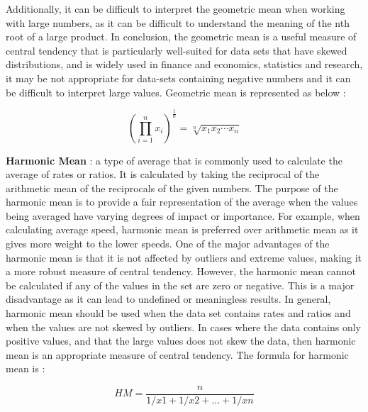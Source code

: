Additionally, it can be difficult to interpret the geometric mean when working with large numbers, as it can be difficult to understand the meaning of the nth root of a large product. In conclusion, the geometric mean is a useful measure of central tendency that is particularly well-suited for data sets that have skewed distributions, and is widely used in finance and economics, statistics and research, it may be not appropriate for data-sets containing negative numbers and it can be difficult to interpret large values. Geometric mean is represented as below :

\begin{equation}
    \left(\prod _{i=1}^{n}x_{i}\right)^{\frac {1}{n}}={\sqrt[{n}]{x_{1}x_{2}\cdots x_{n}}}
\end{equation}


\textbf{Harmonic Mean} :  a type of average that is commonly used to calculate the average of rates or ratios. It is calculated by taking the reciprocal of the arithmetic mean of the reciprocals of the given numbers. The purpose of the harmonic mean is to provide a fair representation of the average when the values being averaged have varying degrees of impact or importance. For example, when calculating average speed, harmonic mean is preferred over arithmetic mean as it gives more weight to the lower speeds. One of the major advantages of the harmonic mean is that it is not affected by outliers and extreme values, making it a more robust measure of central tendency. However, the harmonic mean cannot be calculated if any of the values in the set are zero or negative. This is a major disadvantage as it can lead to undefined or meaningless results. In general, harmonic mean should be used when the data set contains rates and ratios and when the values are not skewed by outliers. In cases where the data contains only positive values, and that the large values does not skew the data, then harmonic mean is an appropriate measure of central tendency. The formula for harmonic mean is :

\begin{equation}
    HM = \frac{n}{1/x1 + 1/x2 + ... + 1/xn}
\end{equation}

